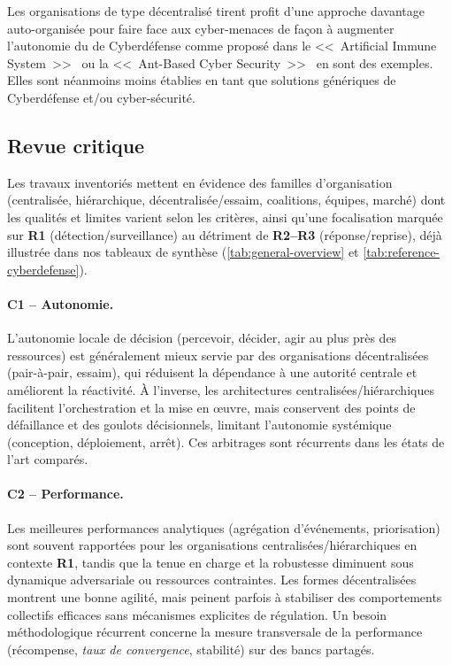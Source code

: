 Les organisations de type décentralisé tirent profit d'une approche davantage auto-organisée pour faire face aux cyber-menaces de façon à augmenter l'autonomie du  de Cyberdéfense comme proposé dans le <<~Artificial Immune System~>>~\cite{morteza2015method} ou la <<~Ant-Based Cyber Security~>>~\cite{haack2011ant} en sont des exemples.
Elles sont néanmoins moins établies en tant que solutions génériques de Cyberdéfense et/ou cyber-sécurité.

\subsection{Revue critique}
\label{sec:soa-revue-critique}

Les travaux inventoriés mettent en évidence des familles d'organisation (centralisée, hiérarchique, décentralisée/essaim, coalitions, équipes, marché) dont les qualités et limites varient selon les critères, ainsi qu'une focalisation marquée sur \textbf{R1} (détection/surveillance) au détriment de \textbf{R2--R3} (réponse/reprise), déjà illustrée dans nos tableaux de synthèse (\autoref{tab:general-overview} et \autoref{tab:reference-cyberdefense}).

\paragraph{C1 -- Autonomie.}
L'autonomie locale de décision (percevoir, décider, agir au plus près des ressources) est généralement mieux servie par des organisations décentralisées (pair-à-pair, essaim), qui réduisent la dépendance à une autorité centrale et améliorent la réactivité. À l'inverse, les architectures centralisées/hiérarchiques facilitent l'orchestration et la mise en œuvre, mais conservent des points de défaillance et des goulots décisionnels, limitant l'autonomie systémique (conception, déploiement, arrêt). Ces arbitrages sont récurrents dans les états de l'art comparés.

\paragraph{C2 -- Performance.}
Les meilleures performances analytiques (agrégation d'événements, priorisation) sont souvent rapportées pour les organisations centralisées/hiérarchiques en contexte \textbf{R1}, tandis que la tenue en charge et la robustesse diminuent sous dynamique adversariale ou ressources contraintes. Les formes décentralisées montrent une bonne agilité, mais peinent parfois à stabiliser des comportements collectifs efficaces sans mécanismes explicites de régulation. Un besoin méthodologique récurrent concerne la mesure transversale de la performance (récompense, \emph{taux de convergence}, stabilité) sur des bancs partagés.

